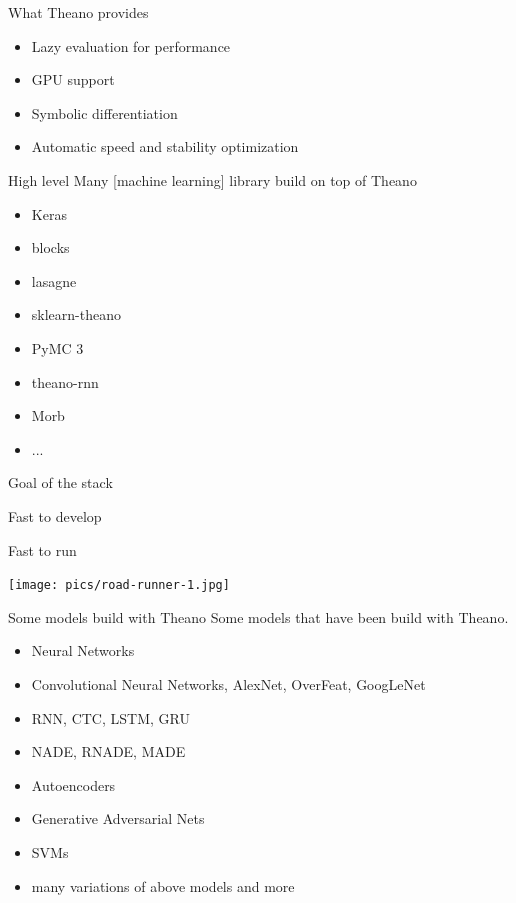 \documentclass[utf8x,xcolor=pdftex,dvipsnames,table]{beamer}
\begin{document}
\begin{frame}{What Theano provides}
  \begin{itemize}
    \item Lazy evaluation for performance
    \item GPU support
    \item Symbolic differentiation
    \item Automatic speed and stability optimization
  \end{itemize}

\end{frame}

\begin{frame}{High level}
  Many [machine learning] library build on top of Theano
  \begin{itemize}
  \item Keras
  \item blocks
  \item lasagne
  \item sklearn-theano
  \item PyMC 3
  \item theano-rnn
  \item Morb
  \item ...
  \end{itemize}
\end{frame}

\begin{frame}{Goal of the stack}
\begin{center}
\begin{bf}Fast to develop\end{bf}\newline \bigskip
\begin{bf}Fast to run\end{bf}\newline \bigskip
\hspace{-2.5cm}
\texttt{[image: pics/road-runner-1.jpg]}
\end{center}
\end{frame}

\begin{frame}{Some models build with Theano}
  Some models that have been build with Theano.
  \begin{itemize}
  \item Neural Networks
  \item Convolutional Neural Networks, AlexNet, OverFeat, GoogLeNet
  \item RNN, CTC, LSTM, GRU
  \item NADE, RNADE, MADE
  \item Autoencoders
  \item Generative Adversarial Nets
  \item SVMs
  \item \begin{bf}many variations of above models and more\end{bf}
  \end{itemize}
\end{frame}
\end{document}
